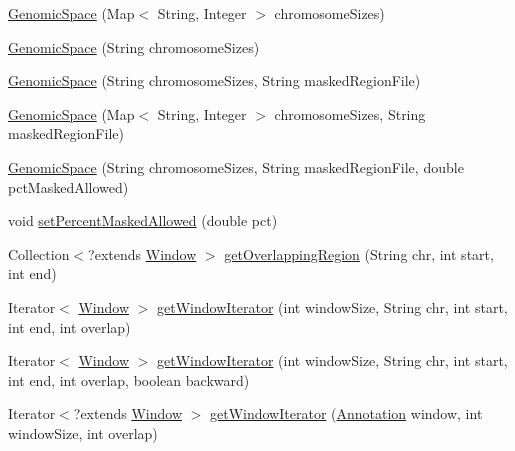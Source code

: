 \begin{DoxyCompactItemize}
\item 
\hyperlink{classumms_1_1core_1_1coordinatesystem_1_1_genomic_space_accf612fa76269c990309129a2eaac792}{Genomic\+Space} (Map$<$ String, Integer $>$ chromosome\+Sizes)
\item 
\hyperlink{classumms_1_1core_1_1coordinatesystem_1_1_genomic_space_aa475f0dfd11975c8784ca5a0e1b91b6a}{Genomic\+Space} (String chromosome\+Sizes)
\item 
\hyperlink{classumms_1_1core_1_1coordinatesystem_1_1_genomic_space_a5d8c54e4a5f4cc5b4f4326b79f2094b5}{Genomic\+Space} (String chromosome\+Sizes, String masked\+Region\+File)
\item 
\hyperlink{classumms_1_1core_1_1coordinatesystem_1_1_genomic_space_aff94238ae6385e25a09e221ecca4aa40}{Genomic\+Space} (Map$<$ String, Integer $>$ chromosome\+Sizes, String masked\+Region\+File)
\item 
\hyperlink{classumms_1_1core_1_1coordinatesystem_1_1_genomic_space_a9b6cab6f9771be7e6193ba6574fcaef0}{Genomic\+Space} (String chromosome\+Sizes, String masked\+Region\+File, double pct\+Masked\+Allowed)
\item 
void \hyperlink{classumms_1_1core_1_1coordinatesystem_1_1_genomic_space_a2a3d42d66612e6a78e335830a599a88a}{set\+Percent\+Masked\+Allowed} (double pct)
\item 
Collection$<$?extends \hyperlink{interfaceumms_1_1core_1_1feature_1_1_window}{Window} $>$ \hyperlink{classumms_1_1core_1_1coordinatesystem_1_1_genomic_space_a6634f9ac9b3c5e86166c004a63e74d6b}{get\+Overlapping\+Region} (String chr, int start, int end)
\item 
Iterator$<$ \hyperlink{interfaceumms_1_1core_1_1feature_1_1_window}{Window} $>$ \hyperlink{classumms_1_1core_1_1coordinatesystem_1_1_genomic_space_ae42bc49e0d87709819e73a74eae06191}{get\+Window\+Iterator} (int window\+Size, String chr, int start, int end, int overlap)
\item 
Iterator$<$ \hyperlink{interfaceumms_1_1core_1_1feature_1_1_window}{Window} $>$ \hyperlink{classumms_1_1core_1_1coordinatesystem_1_1_genomic_space_ad03d9a7ac129d8f4d45627f97958d89d}{get\+Window\+Iterator} (int window\+Size, String chr, int start, int end, int overlap, boolean backward)
\item 
Iterator$<$?extends \hyperlink{interfaceumms_1_1core_1_1feature_1_1_window}{Window} $>$ \hyperlink{classumms_1_1core_1_1coordinatesystem_1_1_genomic_space_ae5f884a776dfac3f5a84ceb7060ac71c}{get\+Window\+Iterator} (\hyperlink{interfaceumms_1_1core_1_1annotation_1_1_annotation}{Annotation} window, int window\+Size, int overlap)

\end{DoxyCompactItemize}
